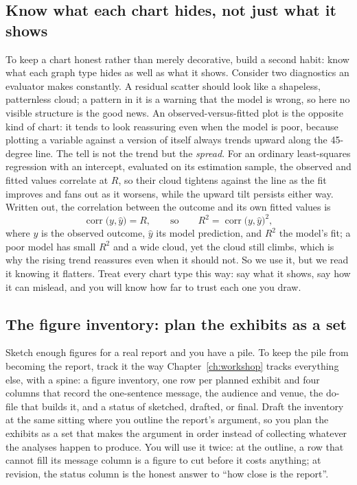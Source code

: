 \subsection{Know what each chart hides, not just what it shows}\label{ch09-sc-hides}
To keep a chart honest rather than merely decorative, build a second habit: know what each graph type hides as well as what it shows. Consider two diagnostics an evaluator makes constantly. A residual scatter should look like a shapeless, patternless cloud; a pattern in it is a warning that the model is wrong, so here no visible structure is the good news. An observed-versus-fitted plot is the opposite kind of chart: it tends to look reassuring even when the model is poor, because plotting a variable against a version of itself always trends upward along the 45-degree line. The tell is not the trend but the \emph{spread}. For an ordinary least-squares regression with an intercept, evaluated on its estimation sample, the observed and fitted values correlate at $R$, so their cloud tightens against the line as the fit improves and fans out as it worsens, while the upward tilt persists either way. Written out, the correlation between the outcome and its own fitted values is
\[
\operatorname{corr}\bigl(y,\hat{y}\bigr)=R,
\qquad\text{so}\qquad
R^{2}=\operatorname{corr}\bigl(y,\hat{y}\bigr)^{2},
\]
where $y$ is the observed outcome, $\hat{y}$ its model prediction, and $R^{2}$ the model's fit; a poor model has small $R^{2}$ and a wide cloud, yet the cloud still climbs, which is why the rising trend reassures even when it should not. So we use it, but we read it knowing it flatters. Treat every chart type this way: say what it shows, say how it can mislead, and you will know how far to trust each one you draw.

\subsection{The figure inventory: plan the exhibits as a set}\label{ch09-sc-inventory}
Sketch enough figures for a real report and you have a pile. To keep the pile from becoming the report, track it the way Chapter~\ref{ch:workshop} tracks everything else, with a spine: a figure inventory, one row per planned exhibit and four columns that record the one-sentence message, the audience and venue, the do-file that builds it, and a status of sketched, drafted, or final. Draft the inventory at the same sitting where you outline the report's argument, so you plan the exhibits as a set that makes the argument in order instead of collecting whatever the analyses happen to produce. You will use it twice: at the outline, a row that cannot fill its message column is a figure to cut before it costs anything; at revision, the status column is the honest answer to \enquote{how close is the report}.

